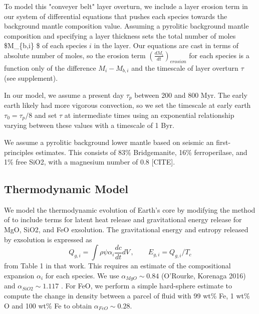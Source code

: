 \documentclass[]{article}
\begin{document}
	To model this "conveyer belt" layer overturn, we include a layer
	erosion term in our system of differential equations that pushes each
	species towards the background mantle composition value. Assuming a
	pyrolitic background mantle composition and specifying a layer thickness
	sets the total number of moles \$M\_\{b,i\} \$ of each species \(i\) in
	the layer. Our equations are cast in terms of absolute number of moles,
	so the erosion term \(\left(\frac{dM_i}{dt}\right)_{erosion}\) for each
	species is a function only of the difference \(M_i - M_{b,i}\) and the timescale of layer overturn \(\tau\) (see supplement).
	
	In our model, we assume a present day \(\tau_p\) between 200 and 800 Myr. The early earth likely had more vigorous convection, so we set the timescale at early earth \(\tau_0 = \tau_p/8\) and set \(\tau\) at intermediate times using an exponential relationship varying between these values with a timescale of 1 Byr. 
	
	We assume a pyrolitic background lower mantle based on seismic an first-principles estimates. This consists of 83\% Bridgemanite, 16\% ferroperilase, and 1\% free SiO2, with a magnesium number of 0.8 {[}CITE{]}.
	
	\subsection{Thermodynamic Model}\label{thermodynamic-model}
	
	We model the thermodynamic evolution of Earth's core by modifying the method of \citet{Nimmo2015} to include terms for latent heat release and gravitational energy release for MgO, SiO2, and FeO exsolution. The gravitational energy and entropy released by exsolution is expressed as
	$$Q_{g,i} = \int \rho \psi \alpha_i \frac{dc}{dt}dV \, ,\qquad E_{g,i} = Q_{g,i}/T_c$$
	from Table 1 in that work. This requires an estimate of the
	compositional expansion \(\alpha_i\) for each species. We use
	\(\alpha_{MgO}\sim0.84\) (O'Rourke, Korenaga 2016) and
	\(\alpha_{SiO2}\sim1.117\) \citep{Hirose2017}. For FeO, we perform a
	simple hard-sphere estimate to compute the change in density between a
	parcel of fluid with 99 wt\% Fe, 1 wt\% O and 100 wt\% Fe to obtain
	\(\alpha_{FeO} \sim 0.28\).
	
\end{document}
